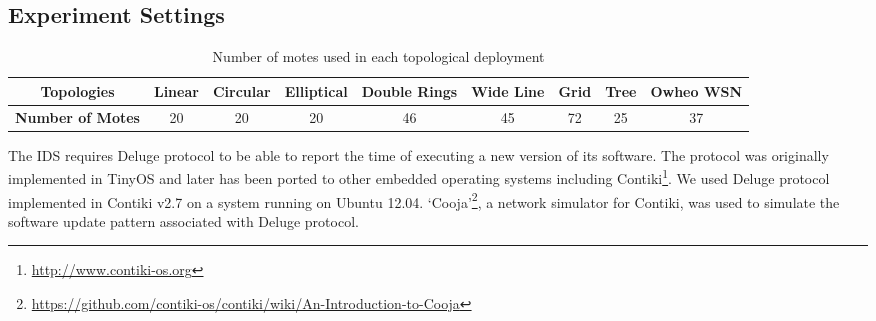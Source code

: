 \documentclass[conference,final]{IEEEtran}
\newcommand{\notedme}[1]{\raisebox{0pt}[0pt][0pt]{\pdfcomment[open=true,color=blue]{#1}}}
\newcommand*{\bd}[1]{\multicolumn{1}{|c|}{\bfseries #1}}
\begin{document}




\subsection*{Experiment Settings}
\label{subsec:sim_env}
\begin{table}[t!]
\centering
\begin{tabular}{|p{2.5cm}|c |c |c |c |c |c |c |c |}
\hline
\bd{Topologies}           & \bd{Linear} & \bd{Circular} & \bd{Elliptical} & \bd{Double Rings} & \bd{Wide Line} & \bd{Grid} & \bd{Tree} & \bd{Owheo WSN}   \\
\hline
\bd{Number of Motes}           & 20 & 20 & 20 & 46 & 45 & 72 & 25 & 37   \\
\hline
\end{tabular}
\caption{Number of motes used in each topological deployment}
\label{tab:topos}
\end{table}

The IDS requires Deluge protocol to be able to report the time of executing  a new version of its software.
The protocol was originally implemented in TinyOS and later has been ported to other embedded operating systems including Contiki\footnote{\url{http://www.contiki-os.org}}. 
We used Deluge protocol implemented in Contiki v2.7 on a system running on Ubuntu 12.04.
`Cooja'\footnote{\url{https://github.com/contiki-os/contiki/wiki/An-Introduction-to-Cooja}}, a network simulator for Contiki, was used to simulate the software update pattern associated with Deluge protocol.
\end{document}
